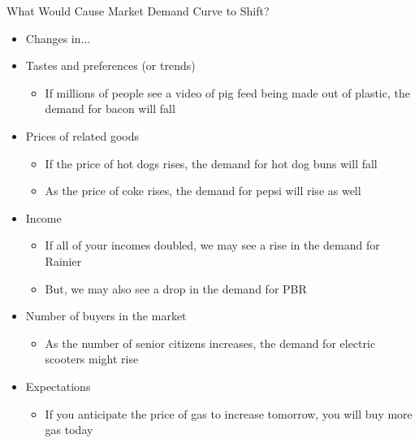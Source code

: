 \documentclass[10pt,xcolor={svgnames}]{beamer}
\begin{document}
\begin{frame}{What Would Cause Market Demand Curve to Shift?}
    \begin{itemize}[<+->]
        \item Changes in...
        \item Tastes and preferences (or trends)
        \begin{itemize}
            \item If millions of people see a video of pig feed being made out of plastic, the demand for bacon will fall
        \end{itemize}
        \item Prices of related goods
        \begin{itemize}
            \item If the price of hot dogs rises, the demand for hot dog buns will fall
            \item As the price of coke rises, the demand for pepsi will rise as well
        \end{itemize}
        \item Income 
        \begin{itemize}
            \item If all of your incomes doubled, we may see a rise in the demand for Rainier 
            \item But, we may also see a drop in the demand for PBR
        \end{itemize}
        \item Number of buyers in the market
        \begin{itemize}
            \item As the number of senior citizens increases, the demand for electric scooters might rise
        \end{itemize}
        \item Expectations
        \begin{itemize}
            \item If you anticipate the price of gas to increase tomorrow, you will buy more gas today
        \end{itemize}
    \end{itemize}
\end{frame}
\end{document}
